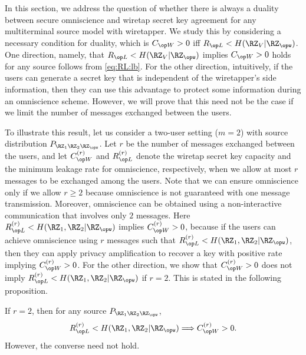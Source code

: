 In this section, we address the question of whether there is always a duality between secure omniscience and wiretap secret key agreement for any multiterminal source model with wiretapper. We study this by considering a necessary condition for duality, which is $\wskc > 0$ iff $\rl < H(\RZ_V|\RZ_{\opw})$. One direction, namely, that $\rl < H(\RZ_V|\RZ_{\opw})$ implies $\wskc > 0$ holds for any  source follows from \eqref{eq:RL:lb}. For the other direction, intuitively, if the users can generate a secret key that is independent of the wiretapper's side information, then they can use this advantage to protect some information during an omniscience scheme. However, we will prove that this need not be the case if we limit the number of messages exchanged between the users. 


To illustrate this result, let us consider a two-user setting ($m=2$) with source distribution $P_{\RZ_1\RZ_2\RZ_{\opw}}$. Let $r$ be the number of messages exchanged between the users, and let $\wskc^{(r)}$ and $\rl^{(r)}$ denote the wiretap secret key capacity and the minimum leakage rate for omniscience, respectively, when we allow at most $r$ messages to be exchanged among the users. Note that we can ensure omniscience only if we allow $r \geq 2$ because omniscience is not guaranteed with one message transmission. Moreover, omniscience can be obtained using a non-interactive communication that involves only $2$ messages.  Here $\rl^{(r)}<H(\RZ_1,\RZ_2|\RZ_{\opw})$ implies $\wskc^{(r)}>0$, because if the users can achieve omniscience using $r$ messages such that $\rl^{(r)}<H(\RZ_1,\RZ_2|\RZ_{\opw})$, then they can apply privacy amplification to recover a key with positive rate implying $\wskc^{(r)} > 0$. For the other direction, we show that $\wskc^{(r)}>0$ does not imply $\rl^{(r)}<H(\RZ_1,\RZ_2|\RZ_{\opw})$ if $r=2$. This is stated in the following proposition.

\begin{proposition} \label{prop:positivity} 

If $r=2$, then for any source $P_{\RZ_1\RZ_2\RZ_{\opw}}$,
    $$\rl^{(r)}<H(\RZ_1,\RZ_2|\RZ_{\opw}) \Longrightarrow \wskc^{(r)}>0.$$
    However, the converse need not hold. %


\end{proposition}

